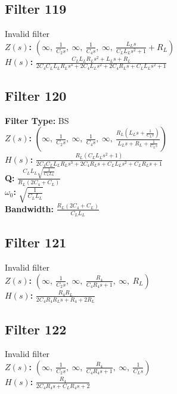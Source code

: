 \documentclass{article}
\begin{document}
\subsection*{Filter 119}
Invalid filter \\ 
\textbf{$Z(s)$:} $\left( \infty, \  \frac{1}{C_{2} s}, \  \infty, \  \frac{1}{C_{4} s}, \  \infty, \  \frac{L_{L} s}{C_{L} L_{L} s^{2} + 1} + R_{L}\right)$ \\ 
\textbf{$H(s)$:} $\frac{C_{L} L_{L} R_{L} s^{2} + L_{L} s + R_{L}}{2 C_{4} C_{L} L_{L} R_{L} s^{3} + 2 C_{4} L_{L} s^{2} + 2 C_{4} R_{L} s + C_{L} L_{L} s^{2} + 1}$ \\ 
\subsection*{Filter 120}
\textbf{Filter Type:} BS \\ 
\textbf{$Z(s)$:} $\left( \infty, \  \frac{1}{C_{2} s}, \  \infty, \  \frac{1}{C_{4} s}, \  \infty, \  \frac{R_{L} \left(L_{L} s + \frac{1}{C_{L} s}\right)}{L_{L} s + R_{L} + \frac{1}{C_{L} s}}\right)$ \\ 
\textbf{$H(s)$:} $\frac{R_{L} \left(C_{L} L_{L} s^{2} + 1\right)}{2 C_{4} C_{L} L_{L} R_{L} s^{3} + 2 C_{4} R_{L} s + C_{L} L_{L} s^{2} + C_{L} R_{L} s + 1}$ \\ 
\textbf{Q:} $\frac{C_{L} L_{L} \sqrt{\frac{1}{C_{L} L_{L}}}}{R_{L} \left(2 C_{4} + C_{L}\right)}$ \\ 
\textbf{$\omega_0$:} $\sqrt{\frac{1}{C_{L} L_{L}}}$ \\ 
\textbf{Bandwidth:} $\frac{R_{L} \left(2 C_{4} + C_{L}\right)}{C_{L} L_{L}}$ \\ 
\subsection*{Filter 121}
Invalid filter \\ 
\textbf{$Z(s)$:} $\left( \infty, \  \frac{1}{C_{2} s}, \  \infty, \  \frac{R_{4}}{C_{4} R_{4} s + 1}, \  \infty, \  R_{L}\right)$ \\ 
\textbf{$H(s)$:} $\frac{R_{4} R_{L}}{2 C_{4} R_{4} R_{L} s + R_{4} + 2 R_{L}}$ \\ 
\subsection*{Filter 122}
Invalid filter \\ 
\textbf{$Z(s)$:} $\left( \infty, \  \frac{1}{C_{2} s}, \  \infty, \  \frac{R_{4}}{C_{4} R_{4} s + 1}, \  \infty, \  \frac{1}{C_{L} s}\right)$ \\ 
\textbf{$H(s)$:} $\frac{R_{4}}{2 C_{4} R_{4} s + C_{L} R_{4} s + 2}$ \\ 
\end{document}
